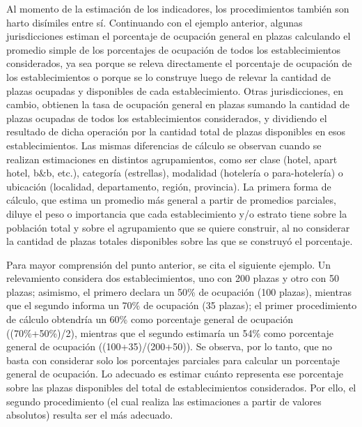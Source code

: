 \documentclass[
]{book}
\begin{document}
Al momento de la estimación de los indicadores, los procedimientos también son harto disímiles entre sí. Continuando con el ejemplo anterior, algunas jurisdicciones estiman el porcentaje de ocupación general en plazas calculando el promedio simple de los porcentajes de ocupación de todos los establecimientos considerados, ya sea porque se releva directamente el porcentaje de ocupación de los establecimientos o porque se lo construye luego de relevar la cantidad de plazas ocupadas y disponibles de cada establecimiento. Otras jurisdicciones, en cambio, obtienen la tasa de ocupación general en plazas sumando la cantidad de plazas ocupadas de todos los establecimientos considerados, y dividiendo el resultado de dicha operación por la cantidad total de plazas disponibles en esos establecimientos. Las mismas diferencias de cálculo se observan cuando se realizan estimaciones en distintos agrupamientos, como ser clase (hotel, apart hotel, b\&b, etc.), categoría (estrellas), modalidad (hotelería o para-hotelería) o ubicación (localidad, departamento, región, provincia). La primera forma de cálculo, que estima un promedio más general a partir de promedios parciales, diluye el peso o importancia que cada establecimiento y/o estrato tiene sobre la población total y sobre el agrupamiento que se quiere construir, al no considerar la cantidad de plazas totales disponibles sobre las que se construyó el porcentaje.

Para mayor comprensión del punto anterior, se cita el siguiente ejemplo. Un relevamiento considera dos establecimientos, uno con 200 plazas y otro con 50 plazas; asimismo, el primero declara un 50\% de ocupación (100 plazas), mientras que el segundo informa un 70\% de ocupación (35 plazas); el primer procedimiento de cálculo obtendría un 60\% como porcentaje general de ocupación ((70\%+50\%)/2), mientras que el segundo estimaría un 54\% como porcentaje general de ocupación ((100+35)/(200+50)). Se observa, por lo tanto, que no basta con considerar solo los porcentajes parciales para calcular un porcentaje general de ocupación. Lo adecuado es estimar cuánto representa ese porcentaje sobre las plazas disponibles del total de establecimientos considerados. Por ello, el segundo procedimiento (el cual realiza las estimaciones a partir de valores absolutos) resulta ser el más adecuado.
\end{document}
